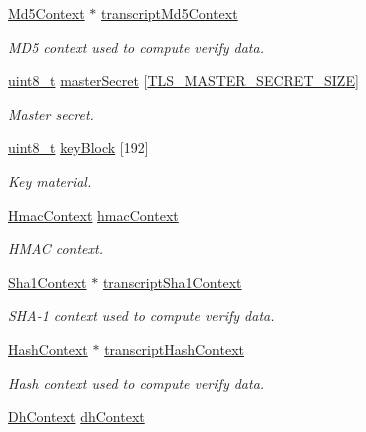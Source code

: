 \begin{DoxyCompactItemize}
\hyperlink{structMd5Context}{Md5\+Context} $\ast$ \hyperlink{struct__TlsContext_afb02e52ed57b23420a3b7534f2da61db}{transcript\+Md5\+Context}
\begin{DoxyCompactList}\small\item\em M\+D5 context used to compute verify data. \end{DoxyCompactList}\item 
\hyperlink{stdint_8h_aba7bc1797add20fe3efdf37ced1182c5}{uint8\+\_\+t} \hyperlink{struct__TlsContext_a2eed8d508d7c690527be1db26cdae8f6}{master\+Secret} \mbox{[}\hyperlink{tls_8h_ae3ac5e6ccd1e8295f15951175e3b7e2b}{T\+L\+S\+\_\+\+M\+A\+S\+T\+E\+R\+\_\+\+S\+E\+C\+R\+E\+T\+\_\+\+S\+I\+ZE}\mbox{]}
\begin{DoxyCompactList}\small\item\em Master secret. \end{DoxyCompactList}\item 
\hyperlink{stdint_8h_aba7bc1797add20fe3efdf37ced1182c5}{uint8\+\_\+t} \hyperlink{struct__TlsContext_a3250ccb2f2a63cbc0948d042575571d0}{key\+Block} \mbox{[}192\mbox{]}
\begin{DoxyCompactList}\small\item\em Key material. \end{DoxyCompactList}\item 
\hyperlink{structHmacContext}{Hmac\+Context} \hyperlink{struct__TlsContext_a97666a3046fedaadf9003020df330ab0}{hmac\+Context}
\begin{DoxyCompactList}\small\item\em H\+M\+AC context. \end{DoxyCompactList}\item 
\hyperlink{structSha1Context}{Sha1\+Context} $\ast$ \hyperlink{struct__TlsContext_a6217c7805de239fc28daac6c9963e51f}{transcript\+Sha1\+Context}
\begin{DoxyCompactList}\small\item\em S\+H\+A-\/1 context used to compute verify data. \end{DoxyCompactList}\item 
\hyperlink{structHashContext}{Hash\+Context} $\ast$ \hyperlink{struct__TlsContext_ab74ea75f1a39578a7d48ecef4f2fb87e}{transcript\+Hash\+Context}
\begin{DoxyCompactList}\small\item\em Hash context used to compute verify data. \end{DoxyCompactList}\item 
\hyperlink{structDhContext}{Dh\+Context} \hyperlink{struct__TlsContext_a4c8e13e84d672392dd262360c2d175c9}{dh\+Context}

\end{DoxyCompactItemize}
